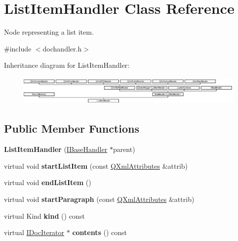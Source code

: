 \hypertarget{class_list_item_handler}{}\section{List\+Item\+Handler Class Reference}
\label{class_list_item_handler}


Node representing a list item.  




{\ttfamily \#include $<$dochandler.\+h$>$}

Inheritance diagram for List\+Item\+Handler\+:\begin{figure}[H]
\begin{center}
\leavevmode
\includegraphics[height=1.467890cm]{class_list_item_handler}
\end{center}
\end{figure}
\subsection*{Public Member Functions}
\begin{DoxyCompactItemize}
\item 
\mbox{\label{class_list_item_handler_aa492d946bdd0000c1d1bb15d64d5a4eb}} 
{\bfseries List\+Item\+Handler} (\mbox{\hyperlink{class_i_base_handler}{I\+Base\+Handler}} $\ast$parent)
\item 
\mbox{\label{class_list_item_handler_adbf3e261858994410a731688f9056d0d}} 
virtual void {\bfseries start\+List\+Item} (const \mbox{\hyperlink{class_q_xml_attributes}{Q\+Xml\+Attributes}} \&attrib)
\item 
\mbox{\label{class_list_item_handler_a5ceb4a676db89d9572a4adddc2a85a7b}} 
virtual void {\bfseries end\+List\+Item} ()
\item 
\mbox{\label{class_list_item_handler_a1e7a8cf13c6903589ab16f4ccc04b13a}} 
virtual void {\bfseries start\+Paragraph} (const \mbox{\hyperlink{class_q_xml_attributes}{Q\+Xml\+Attributes}} \&attrib)
\item 
\mbox{\label{class_list_item_handler_a506aa017fabf8b214aac66e0bb4875e8}} 
virtual Kind {\bfseries kind} () const
\item 
\mbox{\label{class_list_item_handler_a0e3901a01e90785b1420e19aa9c80655}} 
virtual \mbox{\hyperlink{class_i_doc_iterator}{I\+Doc\+Iterator}} $\ast$ {\bfseries contents} () const
\end{DoxyCompactItemize}
